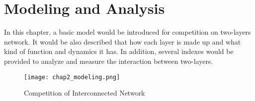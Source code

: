 
\chapter{Modeling and Analysis}
\label{chap2}
In this chapter, a basic model would be introduced for competition on two-layers network. It would be also described that how each layer is made up and what kind of function and dynamics it has. In addition, several indexes would be provided to analyze and measure the interaction between two-layers.\\ 
\begin{figure}[!htb]
	\centering
	\texttt{[image: chap2\_modeling.png]}
	\caption{Competition of Interconnected Network}
	\label{chap2_modeling}
\end{figure}
 
